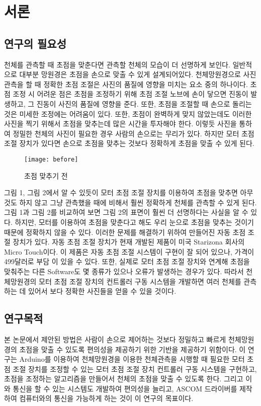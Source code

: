 \section{서론}

\subsection{연구의 필요성}

천체를 관측할 때 초점을 맞춘다면 관측할 천체의 모습이 더 선명하게 보인다. 일반적으로 대부분 망원경은 초점을 손으로 맞출 수 있게 설계되어있다. 천체망원경으로 사진 관측을 할 때 정확한 초점 조절은 사진의 품질에 영향을 미치는 요소 중의 하나이다. 초점 조정 시 어려운 점은 초점을 조정하기 위해 초점 조절 노브에 손이 닿으면 진동이 발생하고, 그 진동이 사진의 품질에 영향을 준다. 또한, 초점을 조절할 때 손으로 돌리는 것은 미세한 조정에는 어려움이 있다. 또한, 초점이 완벽하게 맞지 않았는데도 이러한 사진을 찍기 위해서 초점을 맞추는데 많은 시간을 투자해야 한다. 이렇듯 사진을 통하여 정밀한 천체의 사진이 필요한 경우 사람의 손으로는 무리가 있다. 하지만 모터 초점 조절 장치가 있다면 손으로 초점을 맞추는 것보다 정확하게 초점을 맞출 수 있게 된다.
\begin{wrapfigure}{l}{0.25\textwidth}
\texttt{[image: before]}
\caption{초점 맞추기 전}
\label{fig:before}
\end{wrapfigure}
그림 1, 그림 2에서 알 수 있듯이 모터 초점 조절 장치를 이용하여 초점을 맞추면 아무것도 하지 않고 그냥 관측했을 때에 비해서 훨씬 정확하게 천체를 관측할 수 있게 된다. 그림 1과 그림 2를 비교하여 보면 그림 2의 표면이 훨씬 더 선명하다는 사실을 알 수 있다. 하지만, 모터를 이용하여 초점을 맞춘다고 해도 우리 눈으로 초점을 맞추는 것이기 때문에 정확하지 않을 수 있다. 이러한 문제를 해결하기 위하여 만들어진 자동 초점 조절 장치가 있다. 자동 초점 조절 장치가 현재 개발된 제품이 미국 Starizona 회사의 Micro Touch이다. 이 제품은 자동 초점 조절 시스템이 구현이 잘 되어 있으나, 가격이 499달러로 부담 이 있을 수 있다. 또한, 실제로 모터 초점 조절 장치와 연계해 초점을 맞춰주는 다른 Software도 몇 종류가 있으나 오류가 발생하는 경우가 있다. 따라서 천체망원경의 모터 초점 조절 장치의 컨트롤러 구동 시스템을 개발하면 여러 천체를 관측하는 데 있어서 보다 정확한 사진들을 얻을 수 있을 것이다.

\subsection{연구목적}

본 논문에서 제안된 방법은 사람이 손으로 제어하는 것보다 정밀하고 빠르게 천체망원경의 초점을 맞출 수 있도록 편의성을 제공하기 위한 기반을 제공하기 위함이다. 이 연구는 Arduino를 이용하여 천체망원경을 이용한 천체관측을 시행할 때 필요한 모터 초점 조절 장치를 조정할 수 있는 모터 초점 조절 장치 컨트롤러 구동 시스템을 구현하고, 초점을 조정하는 알고리즘을 만들어서 천체의 초점을 맞출 수 있도록 한다. 그리고 이와 통신을 할 수 있는 시스템도 개발하여 편의성을 늘리고, ASCOM 드라이버를 제작하여 컴퓨터와의 통신을 가능하게 하는 것이 이 연구의 목표이다.
